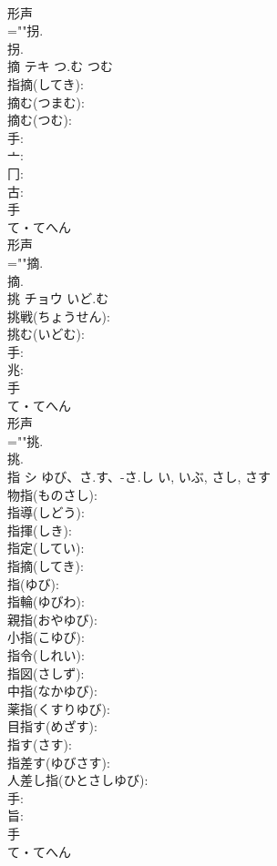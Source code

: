 \documentclass[8pt]{extreport}
\begin{document}
\begin{CJK}{UTF8}{min}
\\	形声 
\\	=""拐.
\\	拐.
\\	摘	テキ	つ.む	つむ	
\\	指摘(してき): 
\\	摘む(つまむ): 
\\	摘む(つむ): 
\\	手: 
\\	亠: 
\\	冂: 
\\	古: 
\\	手	
\\	て・てへん	
\\	形声 
\\	=""摘.
\\	摘.
\\	挑	チョウ	いど.む		
\\	挑戦(ちょうせん): 
\\	挑む(いどむ): 
\\	手: 
\\	兆: 
\\	手	
\\	て・てへん	
\\	形声 
\\	=""挑.
\\	挑.
\\	指	シ	ゆび、さ.す、-さ.し	い, いぶ, さし, さす	
\\	物指(ものさし): 
\\	指導(しどう): 
\\	指揮(しき): 
\\	指定(してい): 
\\	指摘(してき): 
\\	指(ゆび): 
\\	指輪(ゆびわ): 
\\	親指(おやゆび): 
\\	小指(こゆび): 
\\	指令(しれい): 
\\	指図(さしず): 
\\	中指(なかゆび): 
\\	薬指(くすりゆび): 
\\	目指す(めざす): 
\\	指す(さす): 
\\	指差す(ゆびさす): 
\\	人差し指(ひとさしゆび): 
\\	手: 
\\	旨: 
\\	手	
\\	て・てへん	

\end{CJK}
\end{document}
